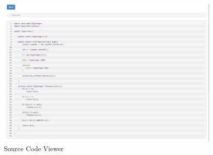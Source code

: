 \begin{figure}[H]
	\centering
	\includegraphics[width=\textwidth]{img/sourceviewer-screen}
	\caption{Source Code Viewer}
\end{figure}